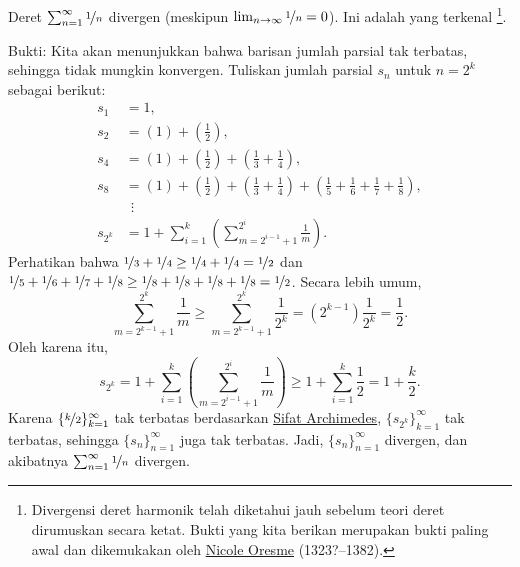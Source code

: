 \begin{example} \label{example:harmonicseries}
Deret $\sum_{n=1}^\infty \nicefrac{1}{n}$ divergen (meskipun
$\lim_{n\to\infty} \nicefrac{1}{n} = 0$).
Ini adalah \emph{} yang terkenal%
\footnote{Divergensi deret harmonik telah diketahui 
jauh sebelum teori deret dirumuskan secara ketat.  Bukti yang
kita berikan merupakan bukti paling awal dan dikemukakan oleh
\href{https://en.wikipedia.org/wiki/Oresme}{Nicole Oresme}
(1323?--1382).}.

Bukti: Kita akan menunjukkan bahwa barisan jumlah parsial tak terbatas, sehingga
tidak mungkin konvergen.
Tuliskan jumlah parsial $s_n$ untuk $n = 2^k$ sebagai berikut:
\begin{align*}
 s_1 & = 1 , \\
 s_2 & = \left( 1 \right) + \left( \frac{1}{2} \right) , \\
 s_4 & = \left( 1 \right) + \left( \frac{1}{2} \right) +
        \left( \frac{1}{3} + \frac{1}{4} \right) , \\
 s_8 & = \left( 1 \right) + \left( \frac{1}{2} \right) +
        \left( \frac{1}{3} + \frac{1}{4} \right) +
        \left( \frac{1}{5} + \frac{1}{6} + \frac{1}{7} + \frac{1}{8} \right) , \\
& ~~ \vdots \\
 s_{2^k} & = 
1 + 
\sum_{i=1}^k
\left(
\sum_{m=2^{i-1}+1}^{2^i} \frac{1}{m}
\right) .
\end{align*}
Perhatikan bahwa $\nicefrac{1}{3} + \nicefrac{1}{4} \geq \nicefrac{1}{4} + \nicefrac{1}{4} =
\nicefrac{1}{2}$ dan
$\nicefrac{1}{5} + \nicefrac{1}{6} + \nicefrac{1}{7} + \nicefrac{1}{8}
\geq \nicefrac{1}{8} + \nicefrac{1}{8} + \nicefrac{1}{8} + \nicefrac{1}{8} =
\nicefrac{1}{2}$.  Secara lebih umum,
\begin{equation*}
\sum_{m=2^{k-1}+1}^{2^k} \frac{1}{m}
\geq
\sum_{m=2^{k-1}+1}^{2^k} \frac{1}{2^k}
=
(2^{k-1}) \frac{1}{2^k} = \frac{1}{2} .
\end{equation*}
Oleh karena itu,
\begin{equation*}
s_{2^k} = 
1 + 
\sum_{i=1}^k
\left(
\sum_{m=2^{i-1}+1}^{2^i} \frac{1}{m}
\right) 
\geq
1 + \sum_{i=1}^k \frac{1}{2} = 1 + \frac{k}{2} .
\end{equation*}
Karena $\{ \nicefrac{k}{2} \}_{k=1}^\infty$ tak terbatas berdasarkan
\hyperref[thm:arch:i]{Sifat Archimedes},
$\{ s_{2^k} \}_{k=1}^\infty$ tak terbatas,
sehingga $\{ s_n \}_{n=1}^\infty$ juga tak terbatas.
Jadi, $\{ s_n \}_{n=1}^\infty$ divergen, dan akibatnya $\sum_{n=1}^\infty \nicefrac{1}{n}$ divergen.
\end{example}

